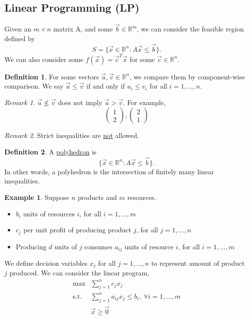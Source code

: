 \documentclass[11pt]{article}
\theoremstyle{definition}
\newtheorem{definition}{Definition}[subsection]
\theoremstyle{definition}
\theoremstyle{definition}
\newtheorem{example}{Example}[subsection]
\theoremstyle{remark}
\newtheorem*{remark}{Remark}
\newcommand{\R}{\mathbb{R}}
\begin{document}
\subsection{Linear Programming (LP)}
Given an $m \times n$ matrix A, and some $\vec b \in \R^m $, we can consider the
feasible region defined by
\begin{equation*}
S =\{\vec x \in \R^n: A\vec x \leq \vec b\}.
\end{equation*}
We can also consider some $f(\vec x) = \vec{c}^T \vec x$ for some $\vec c \in \R^n$.
\begin{definition}
For some vectors $\vec u,\vec v \in \R^n$, we compare them by component-wise comparison.
We say \underline{$\vec u \leq \vec v$} if and only if $u_i \leq v_i$ for all
$i = 1, \dots, n$. 
\end{definition}
\begin{remark}
$\vec u \not\leq \vec v$ does not imply $\vec u > \vec v$. For example,
\begin{equation*}
\begin{pmatrix}
1 \\ 2
\end{pmatrix}
,
\begin{pmatrix}
2 \\ 1
\end{pmatrix}
\end{equation*}
\end{remark}
\begin{remark}
Strict inequalities are \underline{not} allowed.
\end{remark}
\begin{definition}
A \underline{polyhedron} is
\begin{equation*}
\{\vec x \in \R^n: A\vec x \leq \vec b\}.
\end{equation*}
In other words, a polyhedron is the intersection of finitely many linear
inequalities.
\end{definition}
\begin{example}
Suppose $n$ products and $m$ resources.
\begin{itemize}
\item $b_i$ units of resources $i$, for all $i = 1, \dots, m$
\item $c_j$ per unit profit of producing product $j$, for all $j = 1, \dots, n$
\item Producing $d$ units of $j$ consumes $a_{ij}$ units of resource $i$, for
all $i = 1,\dots,m$
\end{itemize}
We define decision variables $x_j$ for all $j = 1,\dots,n$ to represent amount
of product $j$ produced. We can consider the linear program,
\begin{align*}
\max &\sum^n_{j=1} c_jx_j\\
\text{s.t.} & \sum^n_{j=1} a_{ij}x_j \leq b_i,\> \forall i = 1,\dots,m\\
& \vec x \geq \vec 0
\end{align*}
\end{example}
\end{document}
